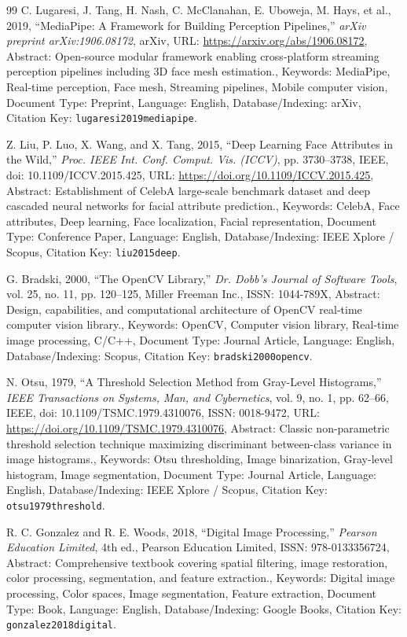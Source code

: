 \documentclass[10pt,a4paper]{article}
\begin{document}
\begin{thebibliography}{99}
C. Lugaresi, J. Tang, H. Nash, C. McClanahan, E. Uboweja, M. Hays, et al., 2019, ``MediaPipe: A Framework for Building Perception Pipelines,'' \textit{arXiv preprint arXiv:1906.08172}, arXiv, URL: \url{https://arxiv.org/abs/1906.08172}, Abstract: Open-source modular framework enabling cross-platform streaming perception pipelines including 3D face mesh estimation., Keywords: MediaPipe, Real-time perception, Face mesh, Streaming pipelines, Mobile computer vision, Document Type: Preprint, Language: English, Database/Indexing: arXiv, Citation Key: \texttt{lugaresi2019mediapipe}.

Z. Liu, P. Luo, X. Wang, and X. Tang, 2015, ``Deep Learning Face Attributes in the Wild,'' \textit{Proc. IEEE Int. Conf. Comput. Vis. (ICCV)}, pp. 3730--3738, IEEE, doi: 10.1109/ICCV.2015.425, URL: \url{https://doi.org/10.1109/ICCV.2015.425}, Abstract: Establishment of CelebA large-scale benchmark dataset and deep cascaded neural networks for facial attribute prediction., Keywords: CelebA, Face attributes, Deep learning, Face localization, Facial representation, Document Type: Conference Paper, Language: English, Database/Indexing: IEEE Xplore / Scopus, Citation Key: \texttt{liu2015deep}.

G. Bradski, 2000, ``The OpenCV Library,'' \textit{Dr. Dobb's Journal of Software Tools}, vol. 25, no. 11, pp. 120--125, Miller Freeman Inc., ISSN: 1044-789X, Abstract: Design, capabilities, and computational architecture of OpenCV real-time computer vision library., Keywords: OpenCV, Computer vision library, Real-time image processing, C/C++, Document Type: Journal Article, Language: English, Database/Indexing: Scopus, Citation Key: \texttt{bradski2000opencv}.

N. Otsu, 1979, ``A Threshold Selection Method from Gray-Level Histograms,'' \textit{IEEE Transactions on Systems, Man, and Cybernetics}, vol. 9, no. 1, pp. 62--66, IEEE, doi: 10.1109/TSMC.1979.4310076, ISSN: 0018-9472, URL: \url{https://doi.org/10.1109/TSMC.1979.4310076}, Abstract: Classic non-parametric threshold selection technique maximizing discriminant between-class variance in image histograms., Keywords: Otsu thresholding, Image binarization, Gray-level histogram, Image segmentation, Document Type: Journal Article, Language: English, Database/Indexing: IEEE Xplore / Scopus, Citation Key: \texttt{otsu1979threshold}.

R. C. Gonzalez and R. E. Woods, 2018, ``Digital Image Processing,'' \textit{Pearson Education Limited}, 4th ed., Pearson Education Limited, ISSN: 978-0133356724, Abstract: Comprehensive textbook covering spatial filtering, image restoration, color processing, segmentation, and feature extraction., Keywords: Digital image processing, Color spaces, Image segmentation, Feature extraction, Document Type: Book, Language: English, Database/Indexing: Google Books, Citation Key: \texttt{gonzalez2018digital}.


\end{thebibliography}
\end{document}
